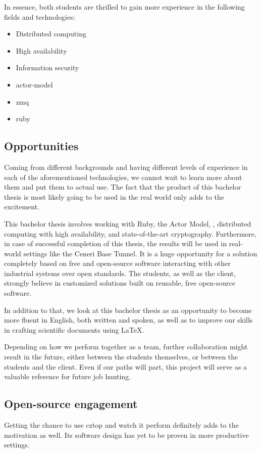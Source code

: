 In essence, both students are thrilled to gain more experience in the following
fields and technologies:

\begin{itemize}
	\item Distributed computing
	\item High availability
	\item Information security
	\item \gls{actor-model}
	\item \gls{zmq}
	\item \gls{ruby}
\end{itemize}

\subsection{Opportunities}
Coming from different backgrounds and having different levels of experience in
each of the aforementioned technologies, we cannot wait to learn more about them and put
them to actual use. The fact that the product of this bachelor thesis is most
likely going to be used in the real world only adds to the excitement.

This bachelor thesis involves working with Ruby, the Actor Model, \zmq,
distributed computing with high availability, and state-of-the-art
cryptography. Furthermore, in case of successful completion of this thesis, the results will be used in real-world settings like the Ceneri
Base Tunnel. It is a huge opportunity for a solution completely based on free
and open-source software interacting with other industrial systems over open standards. The students, as well as the client, strongly believe
in customized solutions built on reusable, free open-source software.

In addition to that, we look at this bachelor thesis as an opportunity to
become more fluent in English, both written and spoken, as well as to improve
our skills in crafting scientific documents using {\LaTeX}.

Depending on how we perform together as a team, further collaboration might
result in the future, either between the students themselves, or between the
students and the client. Even if our paths will part, this project will
serve as a valuable reference for future job hunting.

\subsection{Open-source engagement}
Getting the chance to use \gls{cztop} and watch it perform definitely adds to
the motivation as well. Its software design has yet to be proven in more
productive settings.

